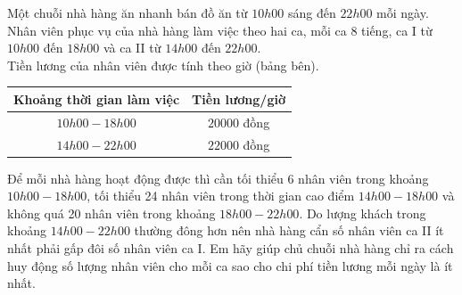 \begin{bt}%
		Một chuỗi nhà hàng ăn nhanh bán đồ ăn từ $10h00$ sáng đến $22h00$ mỗi ngày. Nhân viên phục vụ của nhà hàng làm việc theo hai ca, mỗi ca $8$ tiếng, ca I từ $10h00$ đến $18h00$ và ca II từ $14h00$ đến $22h00$.\\
		{ Tiền lương của nhân viên được tính theo giờ (bảng bên).}
		\begin{center}
			{\begin{tabular}{|c|c|}
					\hline Khoảng thời gian làm việc & Tiền lương/giờ \\ 
					\hline $10h00 - 18h00$ & $20 000$ đồng \\ 
					\hline $14h00 - 22h00$ & $22 000$ đồng \\
					\hline
			\end{tabular} }
		\end{center}
		Để mỗi nhà hàng hoạt động được thì cần tối thiểu 6 nhân viên trong khoảng $10h00 - 18h00$, tối thiểu 24 nhân viên trong thời gian cao điểm $14h00 - 18h00$ và không quá 20 nhân viên trong khoảng $18h00 - 22h00$. Do lượng khách trong khoảng $14h00 - 22h00$ thường đông hơn nên nhà hàng cẩn số nhân viên ca II ít nhất phải gấp đôi số nhân viên ca I. Em hãy giúp chủ chuỗi nhà hàng chỉ ra cách huy động số lượng nhân viên cho mỗi ca sao cho chi phí tiền lương mỗi ngày là ít nhất.
\end{bt}
